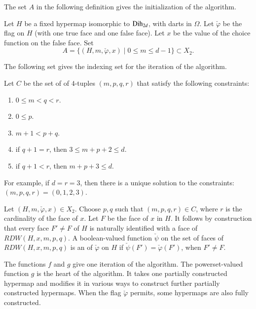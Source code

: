 The set $A$ in the following definition gives the initialization of
the algorithm.

\begin{definition}[A]
  Let $H$ be a fixed hypermap isomorphic to ${\operatorname{Dih}}_{2d}$, with
  darts in $\Omega$.  Let $\check\varphi$ be the flag on $H$ (with one
  true face and one false face).  Let $x$ be the value of the choice
  function on the false face.  Set
\[ 
A = \{(H,m,\check\varphi,x) \mid 0\le m \le d-1\} \subset X_2.
\] 
\end{definition}

The following set gives the indexing set for the iteration of the algorithm.

\begin{definition}[C]
Let $C$ be the set of of $4$-tuples $(m,p,q,r)$ that satisfy the following
constraints:
\begin{enumerate}\wasitemize 
\item $0\le m < q < r$.
\item $0\le p$.
\item $m+1 < p+q$.
\item if $q+1=r$, then $3\le m+p+2 \le d$.
\item if $q+1< r$, then $m+p+3\le d$.
\end{enumerate}\wasitemize 
\end{definition}

For example, if $d=r=3$, then there is a unique solution to
the constraints: $(m,p,q,r)=(0,1,2,3)$.

\begin{definition}[extension]  
  Let $(H,m,\check\varphi,x)\in X_2$.  Choose $p,q$ such that
  $(m,p,q,r)\in C$, where $r$ is the cardinality of the face of $x$.
  Let $F$ be the face of $x$ in $H$.  It follows by construction that
  every face $F'\ne F$ of $H$ is naturally identified with a face of
  $RDW(H,x,m,p,q)$.   A boolean-valued function $\check\psi$
  on the set of faces of $RDW(H,x,m,p,q)$ is an  of
  $\check\varphi$ on $H$ if $\check\psi(F') =\check\varphi(F')$, when
  $F'\ne F$.  %
\end{definition}


The functions $f$ and $g$ give one iteration of the algorithm.  The
powerset-valued function $g$ is the heart of the algorithm.  It takes
one partially constructed hypermap and modifies it in various ways to
construct further partially constructed hypermaps.  When the flag
$\check\varphi$ permits, some hypermaps are also fully constructed.


